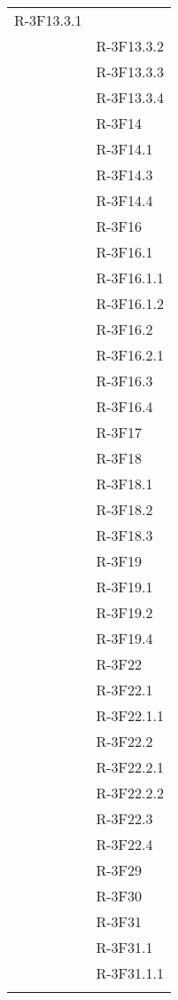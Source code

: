 \begin{longtable}{l p{3cm}}
	R-3F13.3.1 \tabularnewline &
	
	R-3F13.3.2 \tabularnewline &
	
	R-3F13.3.3 \tabularnewline &
	
	R-3F13.3.4 \tabularnewline &
	
	R-3F14 \tabularnewline &
	
	R-3F14.1 \tabularnewline &
	
	R-3F14.3 \tabularnewline &
	
	R-3F14.4 \tabularnewline &
	
	R-3F16 \tabularnewline &
	
	R-3F16.1 \tabularnewline &
	
	R-3F16.1.1 \tabularnewline &
	
	R-3F16.1.2 \tabularnewline &
	
	R-3F16.2 \tabularnewline &
	
	R-3F16.2.1 \tabularnewline &
	
	R-3F16.3 \tabularnewline &
	
	R-3F16.4 \tabularnewline &
	
	R-3F17 \tabularnewline &
	
	R-3F18 \tabularnewline &
	
	R-3F18.1 \tabularnewline &
	
	R-3F18.2 \tabularnewline &
	
	R-3F18.3 \tabularnewline &
	
	R-3F19 \tabularnewline &
	
	R-3F19.1 \tabularnewline &
	
	R-3F19.2 \tabularnewline &
	
	R-3F19.4 \tabularnewline &
	
	R-3F22 \tabularnewline &
	
	R-3F22.1 \tabularnewline &
	
	R-3F22.1.1 \tabularnewline &
	
	R-3F22.2 \tabularnewline &
	
	R-3F22.2.1 \tabularnewline &
	
	R-3F22.2.2 \tabularnewline &
	
	R-3F22.3 \tabularnewline &
	
	R-3F22.4 \tabularnewline &
	
	R-3F29 \tabularnewline &
	
	R-3F30 \tabularnewline &
	
	R-3F31 \tabularnewline &
	
	R-3F31.1 \tabularnewline &
	
	R-3F31.1.1 \tabularnewline &
	

\end{longtable}
